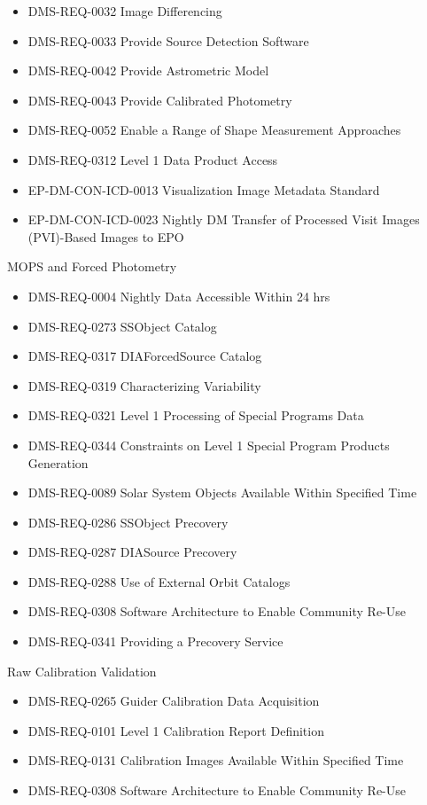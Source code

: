 \begin{itemize}
\item DMS-REQ-0032 Image Differencing
\item DMS-REQ-0033 Provide Source Detection Software
\item DMS-REQ-0042 Provide Astrometric Model
\item DMS-REQ-0043 Provide Calibrated Photometry
\item DMS-REQ-0052 Enable a Range of Shape Measurement Approaches
\item DMS-REQ-0312 Level 1 Data Product Access
\item EP-DM-CON-ICD-0013 Visualization Image Metadata Standard
\item EP-DM-CON-ICD-0023 Nightly DM Transfer of Processed Visit Images (PVI)-Based Images to EPO
\end{itemize}
MOPS and Forced Photometry \begin{itemize}
\item DMS-REQ-0004 Nightly Data Accessible Within 24 hrs
\item DMS-REQ-0273 SSObject Catalog
\item DMS-REQ-0317 DIAForcedSource Catalog
\item DMS-REQ-0319 Characterizing Variability
\item DMS-REQ-0321 Level 1 Processing of Special Programs Data
\item DMS-REQ-0344 Constraints on Level 1 Special Program Products Generation
\item DMS-REQ-0089 Solar System Objects Available Within Specified Time
\item DMS-REQ-0286 SSObject Precovery
\item DMS-REQ-0287 DIASource Precovery
\item DMS-REQ-0288 Use of External Orbit Catalogs
\item DMS-REQ-0308 Software Architecture to Enable Community Re-Use
\item DMS-REQ-0341 Providing a Precovery Service
\end{itemize}
Raw Calibration Validation \begin{itemize}
\item DMS-REQ-0265 Guider Calibration Data Acquisition
\item DMS-REQ-0101 Level 1 Calibration Report Definition
\item DMS-REQ-0131 Calibration Images Available Within Specified Time
\item DMS-REQ-0308 Software Architecture to Enable Community Re-Use
\end{itemize}
